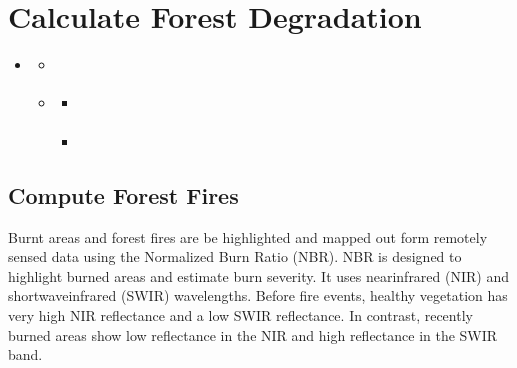 \documentclass[letterpaper,10pt,english]{sphinxmanual}
\begin{document}
\chapter{Calculate Forest Degradation}
\label{\detokenize{Qgis_Plugin/Calculate_forest:calculate-forest-degradation}}\label{\detokenize{Qgis_Plugin/Calculate_forest::doc}}
\begin{sphinxShadowBox}
\begin{itemize}
\item {} 
\sphinxAtStartPar
{}\label{\detokenize{Qgis_Plugin/Calculate_forest:id1}}{\hyperref[\detokenize{Qgis_Plugin/Calculate_forest:calculate-forest-degradation}]{}}
\begin{itemize}
\item {} 
\sphinxAtStartPar
{}\label{\detokenize{Qgis_Plugin/Calculate_forest:id2}}{\hyperref[\detokenize{Qgis_Plugin/Calculate_forest:compute-forest-fires}]{}}

\item {} 
\sphinxAtStartPar
{}\label{\detokenize{Qgis_Plugin/Calculate_forest:id3}}{\hyperref[\detokenize{Qgis_Plugin/Calculate_forest:compute-forest-change-and-total-carbon-summary}]{}}
\begin{itemize}
\item {} 
\sphinxAtStartPar
{}\label{\detokenize{Qgis_Plugin/Calculate_forest:id4}}{\hyperref[\detokenize{Qgis_Plugin/Calculate_forest:step-1-compute-forest-change-and-total-carbon}]{}}

\item {} 
\sphinxAtStartPar
{}\label{\detokenize{Qgis_Plugin/Calculate_forest:id5}}{\hyperref[\detokenize{Qgis_Plugin/Calculate_forest:step-2-generate-carbon-change-summary}]{}}

\end{itemize}

\end{itemize}

\end{itemize}
\end{sphinxShadowBox}




\section{Compute Forest Fires}
\label{\detokenize{Qgis_Plugin/Calculate_forest:compute-forest-fires}}
\sphinxAtStartPar
Burnt areas and forest fires are be highlighted and mapped out form remotely sensed 
data using the Normalized Burn Ratio (NBR). NBR is designed to highlight burned areas and estimate burn
severity. It uses near\sphinxhyphen{}infrared (NIR) and shortwave\sphinxhyphen{}infrared (SWIR) wavelengths. Before fire events,
healthy vegetation has very high NIR reflectance and a low SWIR reflectance. In contrast, recently
burned areas show low reflectance in the NIR and high reflectance in the SWIR band.
\end{document}
